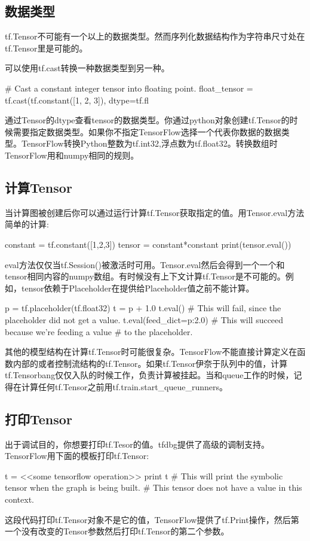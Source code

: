 \subsection{数据类型}
tf.Tensor不可能有一个以上的数据类型。然而序列化数据结构作为字符串尺寸处在tf.Tensor里是可能的。

可以使用tf.cast转换一种数据类型到另一种。
\begin{python}
# Cast a constant integer tensor into floating point.
float_tensor = tf.cast(tf.constant([1, 2, 3]), dtype=tf.fl
\end{python}
通过Tensor的dtype查看tensor的数据类型。你通过python对象创建tf.Tensor的时候需要指定数据类型。如果你不指定TensorFlow选择一个代表你数据的数据类型。TensorFlow转换Python整数为tf.int32,浮点数为tf.float32。转换数组时TensorFlow用和numpy相同的规则。
\subsection{计算Tensor}
当计算图被创建后你可以通过运行计算tf.Tensor获取指定的值。用Tensor.eval方法简单的计算:
\begin{python}
constant = tf.constant([1,2,3])
tensor = constant*constant
print(tensor.eval())
\end{python}
eval方法仅仅当tf.Session()被激活时可用。Tensor.eval然后会得到一个一个和tensor相同内容的numpy数组。有时候没有上下文计算tf.Tensor是不可能的。例如，tensor依赖于Placeholder在提供给Placeholder值之前不能计算。
\begin{python}
p = tf.placeholder(tf.float32)
t = p + 1.0
t.eval()  # This will fail, since the placeholder did not get a value.
t.eval(feed_dict={p:2.0})  # This will succeed because we're feeding a value
                           # to the placeholder.
\end{python}
其他的模型结构在计算tf.Tensor时可能很复杂。TensorFlow不能直接计算定义在函数内部的或者控制流结构的tf.Tensor。如果tf.Tensor伊奈于队列中的值，计算tf.Tensorbang仅仅入队的时候工作，负责计算被挂起。当和queue工作的时候，记得在计算任何tf.Tensor之前用tf.train.start\_queue\_runners。
\subsection{打印Tensor}
出于调试目的，你想要打印tf.Tesor的值。tfdbg提供了高级的调制支持。TensorFlow用下面的模板打印tf.Tensor:
\begin{python}
t = <<some tensorflow operation>>
print t  # This will print the symbolic tensor when the graph is being built.
         # This tensor does not have a value in this context.
\end{python}
这段代码打印tf.Tensor对象不是它的值，TensorFlow提供了tf.Print操作，然后第一个没有改变的Tensor参数然后打印tf.Tensor的第二个参数。

